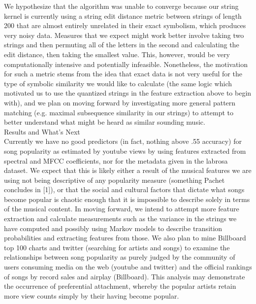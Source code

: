 \documentclass[11pt]{amsart}
\begin{document}
We hypothesize that the algorithm was unable to converge because our string kernel is currently using a string edit distance metric between strings of length 200 that are almost entirely unrelated in their exact symbolism, which produces very noisy data. Measures that we expect might work better involve taking two strings and then permuting all of the letters in the second and calculating the edit distance, then taking the smallest value. This, however, would be very computationally intensive and potentially infeasible. Nonetheless, the motivation for such a metric stems from the idea that exact data is not very useful for the type of symbolic similarity we would like to calculate (the same logic which motivated us to use the quantized strings in the feature extraction above to begin with), and we plan on moving forward by investigating more general pattern matching (e.g. maximal subsequence similarity in our strings) to attempt to better understand what might be heard as similar sounding music. \\

{\huge Results and What's Next \huge} \\

Currently we have no good predictors (in fact, nothing above .55 accuracy) for song popularity as estimated by youtube views by using features extracted from spectral and MFCC coefficients, nor for the metadata given in the labrosa dataset. We expect that this is likely either a result of the musical features  we are using not being descriptive of any popularity measure (something Pachet concludes in [1]), or that the social and cultural factors that dictate what songs become popular is chaotic enough that it is impossible to describe solely in terms of the musical content. In moving forward, we intend to attempt more feature extraction and calculate measurements such as the variance in the strings we have computed and possibly using Markov models to describe transition probabilities and extracting features from those. We also plan to mine Billboard top 100 charts and twitter (searching for artists and songs) to examine the relationships between song popularity as purely judged by the community of users consuming media on the web (youtube and twitter) and the official rankings of songs by record sales and airplay (Billboard). This analysis may demonstrate the occurrence of preferential attachment, whereby the popular artists retain more view counts simply by their having become popular.\\ \\
\end{document}

